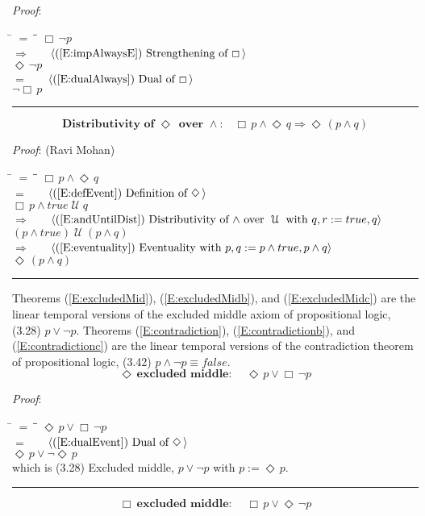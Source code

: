 \documentclass[12pt, fleqn, leqno]{article}
\newcommand{\lgap}{2pt}                             %
\newcommand{\mymathindent}{24pt}                    %
\newcommand{\impl}{\ensuremath{\Rightarrow}}        %
\newcommand{\Until}{\;\mathcal{U}\;}
\newcommand{\Event}{\Diamond\,}
\newcommand{\Always}{\Box\,}
\newcommand{\myqed}{\rule[-.23ex]{1.2ex}{2.0ex}}
\newcommand{\myqedtab}{\hspace{384pt}}              %
\newcommand{\Gll} {\langle}                         %
\newcommand{\Ggg} {\rangle}                         %
\newcommand{\Hint}[1]     {\ \ \ $\Gll              \mbox{#1} \Ggg$ }   %
\begin{document}
\emph{Proof}:
\begin{tabbing}
\hspace{\mymathindent} \= $= \;$ \= \myqedtab \= \kill
  \> \>   $\Always\neg p$\\[\lgap]
  \> $\impl$  \>  \Hint{(\ref{E:impAlwaysE}) Strengthening of $\Always$}\\[\lgap]
  \> \>   $\Event\neg p$\\[\lgap]
  \> $=$  \>  \Hint{(\ref{E:dualAlways}) Dual of $\Always$}\\[\lgap]
  \> \>   $\neg\Always p$ \quad \myqed
\end{tabbing}
\begin{equation}\label{E:alwaysAndEvent}
\textbf{Distributivity of $\Event$ over $\land$:}\quad \Always p \land \Event q \impl \Event (p \land q)
\end{equation}

\emph{Proof}: (Ravi Mohan)
\begin{tabbing}
\hspace{\mymathindent} \= $= \;$ \= \myqedtab \= \kill
  \> \>   $\Always p \land \Event q$\\[\lgap]
  \> $=$  \>  \Hint{(\ref{E:defEvent}) Definition of $\Event$}\\[\lgap]
  \> \>   $\Always p \land true \Until q$\\[\lgap]
  \> $\impl$  \>  \Hint{(\ref{E:andUntilDist}) Distributivity of $\land$ over $\Until$ with $q,r :=true, q$}\\[\lgap]
  \> \>   $(p \land true) \Until (p \land q)$\\[\lgap]
  \> $\impl$  \>  \Hint{(\ref{E:eventuality}) Eventuality with $p,q:=p\land true,p\land q$}\\[\lgap]
  \> \>   $\Event (p \land q)$ \quad \myqed
\end{tabbing}

Theorems (\ref{E:excludedMid}), (\ref{E:excludedMidb}), and (\ref{E:excludedMidc}) are the linear temporal versions of the excluded middle axiom of propositional logic, (3.28) $p\lor\neg p$.
Theorems (\ref{E:contradiction}), (\ref{E:contradictionb}), and (\ref{E:contradictionc}) are the linear temporal versions of the contradiction theorem of propositional logic, (3.42) $p\land\neg p\equiv false$.
\begin{equation}\label{E:excludedMid}
\textbf{$\Event$ excluded middle:}\quad \Event p \lor \Always\neg p
\end{equation}

\emph{Proof}:
\begin{tabbing}
\hspace{\mymathindent} \= $= \;$ \= \myqedtab \= \kill
  \> \>   $\Event p \lor \Always\neg p$\\[\lgap]
  \> $=$  \>  \Hint{(\ref{E:dualEvent}) Dual of $\Event$}\\[\lgap]
  \> \>   $\Event p \lor \neg\Event p$\\[\lgap]
  \> which is (3.28) Excluded middle, $p\lor\neg p$ with $p := \Event p$. \quad \myqed
\end{tabbing}
\begin{equation}\label{E:excludedMidb}
\textbf{$\Always$ excluded middle:}\quad \Always p \lor \Event\neg p
\end{equation}
\end{document}
